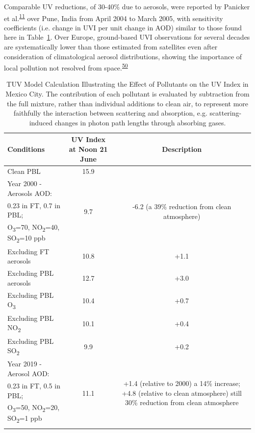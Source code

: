 \documentclass[10pt]{article}
\begin{document}
{Comparable UV reductions, of 30-40\% due to aerosols, were reported by
Panicker et al.}\textsuperscript{\hyperref[csl:11]{11}}{ over Pune, India from April 2004 to
March 2005, with sensitivity coefficients (i.e. change in UVI per unit
change in AOD) similar to those found here in
Table~}{\ref{table:TUVmodel}}{. Over Europe,
ground-based UVI observations for several decades are systematically
lower than those estimated from satellites even after consideration of
climatological aerosol distributions, showing the importance of local
pollution not resolved from space.}\textsuperscript{\hyperref[csl:50]{50}}
\begin{table}[H]
\centering
\begin{tabular}{lcc} \hline
\textbf{Conditions} & \textbf{UV Index at Noon 21 June} & \textbf{Description} \\ \hline
Clean PBL & 15.9 & \\ \hline
Year 2000 - Aerosols AOD:&\multirow{3}{*}{9.7}& \multirow{3}{5cm}{-6.2 (a 39\% reduction from clean atmosphere)} \\ 0.23 in FT, 0.7 in PBL;\\ O\textsubscript{3}=70, NO\textsubscript{2}=40, SO\textsubscript{2}=10 ppb\\ \hline
Excluding FT aerosols & 10.8 & +1.1 \\\hline
Excluding PBL aerosols & 12.7 & +3.0 \\\hline
Excluding PBL O\textsubscript{3} & 10.4 & +0.7 \\\hline
Excluding PBL NO\textsubscript{2} & 10.1 & +0.4 \\\hline
Excluding PBL SO\textsubscript{2} & 9.9 & +0.2\\\hline
Year 2019 - Aerosol AOD: & \multirow{4}{*}{11.1} & \multirow{4}{5cm}{+1.4 (relative to 2000) a 14\% increase; +4.8 (relative to clean atmosphere) still 30\% reduction from clean atmosphere}\\
0.23 in FT, 0.5 in PBL;\\ O\textsubscript{3}=50, NO\textsubscript{2}=20, SO\textsubscript{2}=1 ppb\\ &&\\\hline
\end{tabular}
\caption{{TUV Model Calculation Illustrating the Effect of Pollutants on the UV Index in Mexico City. The contribution of each pollutant is evaluated by subtraction from the full mixture, rather than individual additions to clean air, to represent more faithfully the interaction between scattering and absorption, e.g. scattering-induced changes in photon path lengths through absorbing gases.}}
\label{table:TUVmodel}
\end{table}
\end{document}
